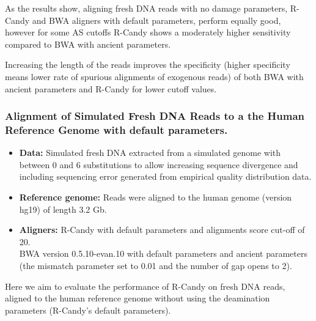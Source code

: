 \documentclass[11pt,a4paper]{report}
\begin{document}
As the results show, aligning fresh DNA reads with no damage parameters, 
R-Candy and BWA aligners with default parameters, perform equally good, 
however for some AS cutoffs R-Candy shows a moderately higher sensitivity 
compared to BWA with ancient parameters.

Increasing the length of the reads improves the specificity (higher
specificity means lower rate of spurious alignments of exogenous reads)
of both BWA with ancient parameters and R-Candy for lower cutoff values.



\subsubsection{ Alignment of Simulated Fresh DNA Reads to a the Human Reference Genome
with default parameters.}
\label{ Alignment of Simulated Fresh DNA Reads to a the Human Reference Genome with
default parameters.}

 \begin{itemize}
 
   \item \textbf{Data:} Simulated fresh DNA extracted from a simulated genome 
   with between 0 and 6 substitutions to allow increasing sequence divergence
   and including sequencing error generated from empirical quality distribution
   data.
   
   \item \textbf{Reference genome:} Reads were aligned to the human genome 
   (version hg19) of length 3.2 Gb.

    \item \textbf{Aligners:} 
R-Candy with default parameters and alignments score cut-off of 20. \\
BWA version 0.5.10-evan.10 with default parameters and ancient
parameters (the mismatch parameter set to 0.01 and the number of gap
opens to 2)\cite{green2010draft}.
	
 \end{itemize}
	
	
Here we aim to evaluate the performance of R-Candy on fresh DNA reads, 
aligned to the human reference genome without using the deamination parameters  
(R-Candy's default parameters).
\end{document}
